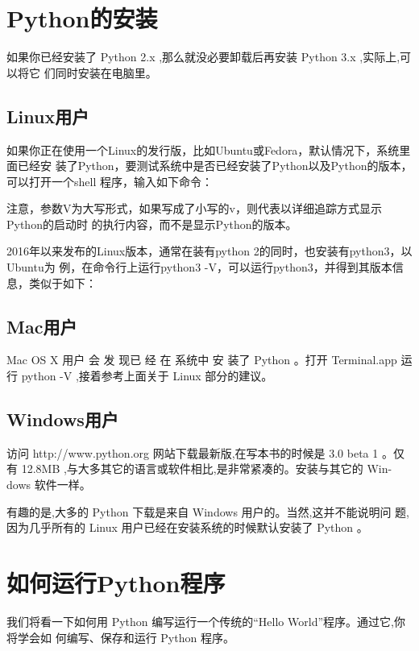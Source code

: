 \section{Python的安装}
如果你已经安装了 Python 2.x ,那么就没必要卸载后再安装 Python 3.x ,实际上,可以将它
们同时安装在电脑里。

\subsection{Linux用户}
如果你正在使用一个Linux的发行版，比如Ubuntu或Fedora，默认情况下，系统里面已经安
装了Python，要测试系统中是否已经安装了Python以及Python的版本，可以打开一个shell
程序，输入如下命令：

注意，参数V为大写形式，如果写成了小写的v，则代表以详细追踪方式显示Python的启动时
的执行内容，而不是显示Python的版本。

2016年以来发布的Linux版本，通常在装有python 2的同时，也安装有python3，以Ubuntu为
例，在命令行上运行python3 -V，可以运行python3，并得到其版本信息，类似于如下：


\subsection{Mac用户}

Mac OS X 用户 会 发 现已 经 在 系统中 安 装了 Python 。打开 Terminal.app 运行
python -V ,接着参考上面关于 Linux 部分的建议。

\subsection{Windows用户}

访问 http://www.python.org 网站下载最新版,在写本书的时候是 3.0 beta 1 。仅
有 12.8MB ,与大多其它的语言或软件相比,是非常紧凑的。安装与其它的 Win-
dows 软件一样。

有趣的是,大多的 Python 下载是来自 Windows 用户的。当然,这并不能说明问
题,因为几乎所有的 Linux 用户已经在安装系统的时候默认安装了 Python 。


\section{如何运行Python程序}
我们将看一下如何用 Python 编写运行一个传统的“Hello World”程序。通过它,你将学会如
何编写、保存和运行 Python 程序。

